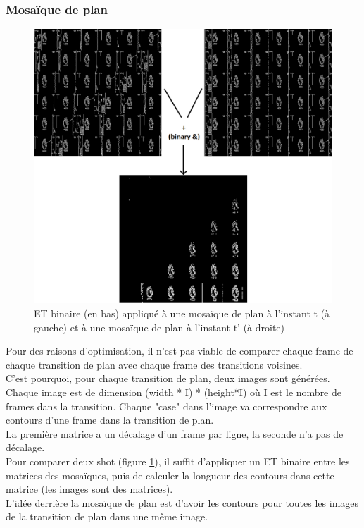 \documentclass[11pt]{article}
\begin{document}
\subsubsection{Mosaïque de plan}
\label{sec:org8968515}
\begin{figure}[htbp]
\centering
\includegraphics[width=16cm]{mosaique_add.png}
\caption{ET binaire (en bas) appliqué à une mosaïque de plan à l'instant t (à gauche) et à une mosaïque de plan à l'instant t' (à droite) \label{mosaic}}
\end{figure}
Pour des raisons d'optimisation, il n'est pas viable de comparer chaque frame de chaque transition de plan avec chaque frame des transitions voisines.\\
C'est pourquoi, pour chaque transition de plan, deux images sont générées.\\
Chaque image est de dimension (width * I) * (height*I) où I est le nombre de frames dans la transition. Chaque "case" dans l'image va correspondre aux contours d'une frame dans la transition de plan.\\
La première matrice a un décalage d'un frame par ligne, la seconde n'a pas de décalage.\\
Pour comparer deux shot (figure \ref{mosaic}), il suffit d’appliquer un ET binaire entre les matrices des mosaïques, puis de calculer la longueur des contours dans cette matrice (les images sont des matrices).\\
L'idée derrière la mosaïque de plan est d'avoir les contours pour toutes les images de la transition de plan dans une même image.\\
\end{document}
